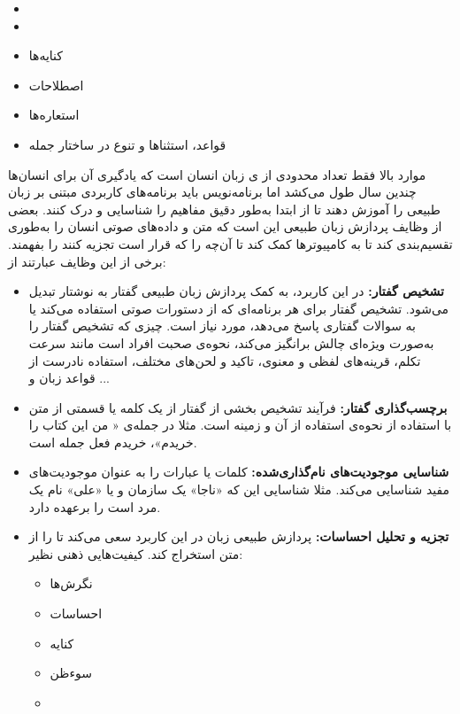 \begin{itemize}
    \item {}
    \item {}
    \item کنایه‌ها
    \item اصطلاحات
    \item استعاره‌ها
    \item قواعد، استثناها و تنوع در ساختار جمله
\end{itemize}
موارد بالا فقط تعداد محدودی از
ی
زبان انسان است که یادگیری آن برای انسان‌ها چندین سال طول می‌کشد اما برنامه‌نویس باید برنامه‌های کاربردی مبتنی بر زبان طبیعی را آموزش دهند تا از ابتدا به‌طور دقیق مفاهیم را شناسایی و درک کنند.
بعضی از وظایف پردازش زبان طبیعی این است که متن و داده‌های صوتی انسان را به‌طوری تقسیم‌بندی  کند تا به کامپیوترها کمک کند تا آن‌چه را که قرار است تجزیه کنند را بفهمند. برخی از این وظایف عبارتند از:
\begin{itemize}
    \item
    \textbf{تشخیص گفتار:}
    در این کاربرد، به کمک پردازش زبان طبیعی گفتار به نوشتار تبدیل می‌شود. تشخیص گفتار برای هر برنامه‌ای که از  دستورات صوتی استفاده می‌کند یا به سوالات گفتاری پاسخ می‌دهد، مورد نیاز است. چیزی که تشخیص گفتار را به‌صورت ویژه‌ای چالش‌ برانگیز می‌کند، نحوه‌ی صحبت افراد است مانند سرعت تکلم، قرینه‌های لفظی و معنوی، تاکید و لحن‌های مختلف، استفاده نادرست از قواعد زبان و ... 
    \item \textbf{برچسب‌گذاری گفتار:}
    فرآیند تشخیص بخشی از گفتار از یک کلمه یا قسمتی از متن با استفاده از نحوه‌ی استفاده از آن و زمینه است. مثلا در جمله‌ی « من این کتاب را خریدم»‌، خریدم فعل جمله است.
    \item \textbf{شناسایی موجودیت‌های نام‌گذاری‌شده:}
    کلمات یا عبارات را به عنوان موجودیت‌های مفید شناسایی می‌کند. مثلا شناسایی این که «ناجا» یک سازمان و یا «علی» نام یک مرد است را برعهده دارد.
    \item \textbf{تجزیه و تحلیل احساسات:}
    پردازش طبیعی زبان در این کاربرد سعی می‌کند تا 
    را از متن استخراج کند. کیفیت‌هایی ذهنی نظیر:
    \begin{itemize}
        \item نگرش‌ها
        \item احساسات
        \item کنایه
        \item سوءظن
        \item {}
    \end{itemize}
\end{itemize}

